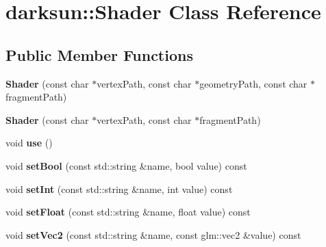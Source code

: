 \hypertarget{classdarksun_1_1_shader}{}\section{darksun\+::Shader Class Reference}
\label{classdarksun_1_1_shader}
\subsection*{Public Member Functions}
\begin{DoxyCompactItemize}
\item 
\mbox{\label{classdarksun_1_1_shader_a9ecee86dd99f3795b2e22b4bd93ce785}} 
{\bfseries Shader} (const char $\ast$vertex\+Path, const char $\ast$geometry\+Path, const char $\ast$fragment\+Path)
\item 
\mbox{\label{classdarksun_1_1_shader_a4c4266e4257b6de523bc8980c3ff3141}} 
{\bfseries Shader} (const char $\ast$vertex\+Path, const char $\ast$fragment\+Path)
\item 
\mbox{\label{classdarksun_1_1_shader_a171b812a672599ce4adcf02c963505df}} 
void {\bfseries use} ()
\item 
\mbox{\label{classdarksun_1_1_shader_a72b4c1dd8c6e01aacfbdec981c94ad86}} 
void {\bfseries set\+Bool} (const std\+::string \&name, bool value) const
\item 
\mbox{\label{classdarksun_1_1_shader_a6b558c7a2478c945bd422e9ff6776f67}} 
void {\bfseries set\+Int} (const std\+::string \&name, int value) const
\item 
\mbox{\label{classdarksun_1_1_shader_a4511b789c8f2426c6f6e2314ed63fee5}} 
void {\bfseries set\+Float} (const std\+::string \&name, float value) const
\item 
\mbox{\label{classdarksun_1_1_shader_a7d4d852b08df9a3a714244adf9975f56}} 
void {\bfseries set\+Vec2} (const std\+::string \&name, const glm\+::vec2 \&value) const
\item 
\mbox{\label{classdarksun_1_1_shader_a3bcb0149952af16e1ed5c78ba4241a47}} 

\end{DoxyCompactItemize}
